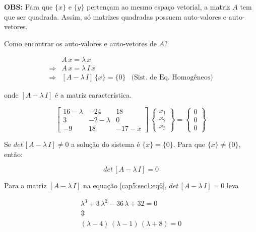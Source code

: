\textbf{OBS:} Para que $ \{x\} $ e $ \{y\} $ pertençam ao mesmo espaço vetorial, a matriz $ A $ tem que ser quadrada. Assim, só matrizes quadradas possuem auto-valores e auto-vetores.

Como encontrar os auto-valores e auto-vetores de $ A $?

\begin{equation}
\label{cap5:sec1:eq5}
 \begin{array}{lll}
              & A \, x = \lambda \, x &\\
  \Rightarrow & A \, x = \lambda \, I \, x &\\
  \Rightarrow & [A - \lambda \, I] \, \{x\} = \{0\} & \mbox{(Sist. de Eq. Homogêneos)}
 \end{array}
\end{equation}

onde $ [A - \lambda \, I] $ é a matriz característica.

\begin{equation}
\label{cap5:sec1:eq6}
 \left[
 \begin{array}{rrr}
  16 - \lambda & -24          & 18\\
  3            & -2 - \lambda & 0\\
  -9           & 18           & -17-x
 \end{array}
 \right]
 \,
 \left\{
 \begin{array}{c}
  x_1\\
  x_2\\
  x_3
 \end{array}
 \right\}
 =
 \left\{
 \begin{array}{c}
  0\\
  0\\
  0
 \end{array}
 \right\}
\end{equation}

Se $ det \, [A - \lambda \, I] \neq 0 $ a solução do sistema é $ \{x\} = \{0\} $. Para que $ \{x\} \neq \{0\} $, então:

\begin{equation}
\label{cap5:sec1:eq7}
 det \, [A - \lambda \, I] = 0
\end{equation}

Para a matriz $ [A - \lambda \, I] $ na equação \ref{cap5:sec1:eq6}, $ det \, [A - \lambda \, I] = 0 $ leva

\[
 \begin{array}{c}
  \lambda^3 + 3 \, \lambda^2 - 36 \, \lambda + 32 = 0\\
  \Updownarrow\\
  (\lambda - 4) \, (\lambda - 1) \, (\lambda + 8) = 0
 \end{array}
\]

